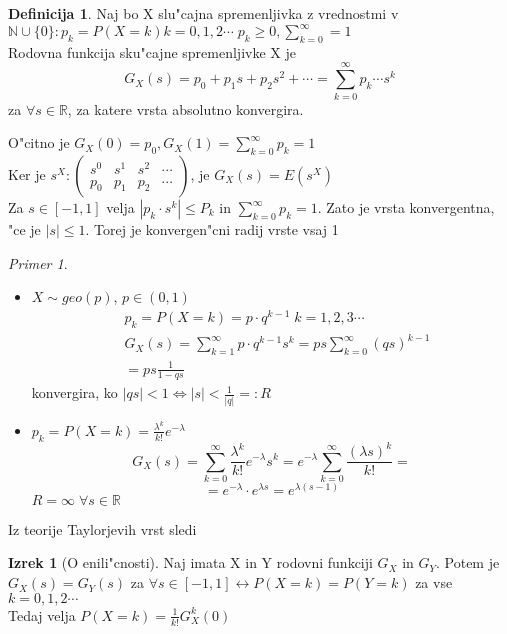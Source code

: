 \documentclass[a4paper,12pt]{article}
\theoremstyle{definition}
\newtheorem{defn}[counter]{Definicija}
\newtheorem{theorem}[counter]{Izrek}
\theoremstyle{remark}
\newtheorem*{ex}{Primer}
\newcommand{\N}{\mathbb{N}}
\newcommand{\R}{\mathbb{R}}
\begin{document}
\begin{defn}
    Naj bo X slu"cajna spremenljivka z vrednostmi v $\N \cup \{0\}: p_k = P(X = k) k = 0, 1, 2 \cdots \;
    p_k \geq 0, \sum_{k = 0}^{\infty} = 1$ \\
    Rodovna funkcija sku"cajne spremenljivke X je
    \[G_X(s) = p_0 + p_1 s + p_2 s^2 + \cdots = \sum_{k = 0}^{\infty} p_k \cdots s^k\]
    za $\forall s \in \R$, za katere vrsta absolutno konvergira.
\end{defn}

O"citno je $G_X(0) = p_0, G_X(1) = \sum_{k = 0}^{\infty} p_k = 1$ \\
Ker je $s^X: \begin{pmatrix}s^0 & s^1 & s^2 & \cdots \\ p_0 & p_1 & p_2 & \cdots\end{pmatrix}$, je $G_X(s) = E(s^X)$ \\
Za $s \in [-1,1]$ velja $|p_k \cdot s^k| \leq P_k$ in $\sum_{k = 0}^{\infty} p_k = 1$. Zato je vrsta
konvergentna, "ce je $|s| \leq 1$. Torej je konvergen"cni radij vrste vsaj 1

\begin{ex} \text{} \\
    \begin{itemize}
        \item $X \sim geo(p)$, $p \in (0,1)$
            \begin{align*}
                &p_k = P(X = k) = p \cdot q^{k-1} \; k = 1,2,3 \cdots \\
                &G_X(s) = \sum_{k = 1}^{\infty} p \cdot q^{k - 1} s^k = ps \sum_{k = 0}^{\infty} (qs)^{k-1} \\
                &= ps \frac{1}{1 - qs}
            \end{align*}
            konvergira, ko $|qs| < 1 \Leftrightarrow |s| < \frac{1}{|q|} =: R$
        \item $p_k = P(X = k) = \frac{\lambda^k}{k!} e^{-\lambda}$
            \[G_X(s) = \sum_{k = 0}^{\infty} \frac{\lambda^k}{k!} e^{-\lambda} s^k =
            e^{-\lambda} \sum_{k = 0}^{\infty} \frac{(\lambda s)^k}{k!} = \]
            \[= e^{-\lambda} \cdot e^{\lambda s} = e^{\lambda(s - 1)} \]
            $R = \infty \; \forall s \in \R$
    \end{itemize}
\end{ex}

Iz teorije Taylorjevih vrst sledi

\begin{theorem}[O enili"cnosti]
    Naj imata X in Y rodovni funkciji $G_X$ in $G_Y$. Potem je $G_X(s) = G_Y(s)$ za $\forall s \in [-1,1] \leftrightarrow
    P(X = k) = P(Y = k)$ za vse $k = 0, 1, 2 \cdots$ \\
    Tedaj velja $P(X = k) = \frac{1}{k!} G_X^{k}(0)$
\end{theorem}
\end{document}
